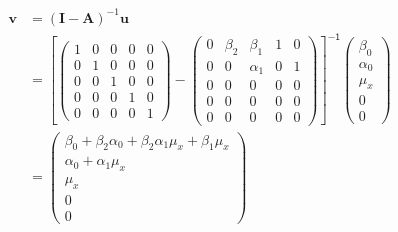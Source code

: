 \documentclass[
]{book}
\theoremstyle{definition}
\theoremstyle{definition}
\theoremstyle{definition}
\theoremstyle{remark}
\begin{document}
\begin{align*}\mathbf{v} &=\left( \mathbf{I} - \mathbf{A} \right)^{-1} \mathbf{u}\\ &=\left[\left( \begin{array}{ccccc} 1 & 0 & 0 & 0 & 0 \\ 0 & 1 & 0 & 0 & 0 \\ 0 & 0 & 1 & 0 & 0 \\ 0 & 0 & 0 & 1 & 0 \\ 0 & 0 & 0 & 0 & 1 \end{array} \right)-\left( \begin{array}{ccccc} 0 & \beta  _{2} & \beta  _{1} & 1 & 0 \\ 0 & 0 & \alpha  _{1} & 0 & 1 \\ 0 & 0 & 0 & 0 & 0 \\ 0 & 0 & 0 & 0 & 0 \\ 0 & 0 & 0 & 0 & 0 \end{array} \right)\right]^{\mathsf{-1}}\left( \begin{array}{c} \beta  _{0} \\ \alpha  _{0} \\ \mu  _{x} \\ 0 \\ 0 \end{array} \right)\\ &=\left( \begin{array}{c} \beta  _{0} + \beta  _{2} \alpha  _{0} + \beta  _{2} \alpha  _{1} \mu  _{x} + \beta  _{1} \mu  _{x} \\ \alpha  _{0} + \alpha  _{1} \mu  _{x} \\ \mu  _{x} \\ 0 \\ 0 \end{array} \right)\end{align*}
\end{document}
